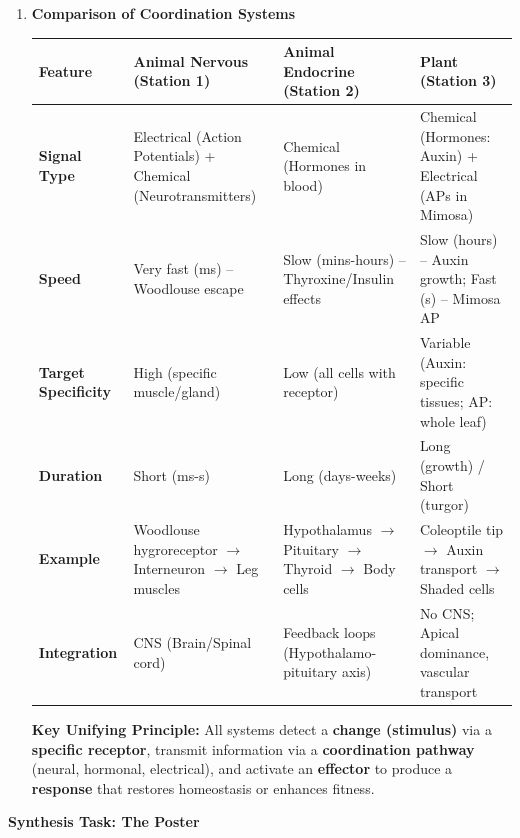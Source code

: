 \documentclass[11pt]{article}
\begin{document}
\begin{enumerate}
    \item \textbf{Comparison of Coordination Systems}
    \begin{center}
    \begin{tabularx}{\linewidth}{|l|X|X|X|}\hline
    \rowcolor{popblueL}
    \textbf{Feature} & \textbf{Animal Nervous (Station 1)} & \textbf{Animal Endocrine (Station 2)} & \textbf{Plant (Station 3)} \\\hline
    \textbf{Signal Type} & Electrical (Action Potentials) + Chemical (Neurotransmitters) & Chemical (Hormones in blood) & Chemical (Hormones: Auxin) + Electrical (APs in Mimosa) \\\hline
    \textbf{Speed} & Very fast (ms) -- Woodlouse escape & Slow (mins-hours) -- Thyroxine/Insulin effects & Slow (hours) -- Auxin growth; Fast (s) -- Mimosa AP \\\hline
    \textbf{Target Specificity} & High (specific muscle/gland) & Low (all cells with receptor) & Variable (Auxin: specific tissues; AP: whole leaf) \\\hline
    \textbf{Duration} & Short (ms-s) & Long (days-weeks) & Long (growth) / Short (turgor) \\\hline
    \textbf{Example} & Woodlouse hygroreceptor $\rightarrow$ Interneuron $\rightarrow$ Leg muscles & Hypothalamus $\rightarrow$ Pituitary $\rightarrow$ Thyroid $\rightarrow$ Body cells & Coleoptile tip $\rightarrow$ Auxin transport $\rightarrow$ Shaded cells \\\hline
    \textbf{Integration} & CNS (Brain/Spinal cord) & Feedback loops (Hypothalamo-pituitary axis) & No CNS; Apical dominance, vascular transport \\\hline
    \end{tabularx}
    \end{center}
    \textbf{Key Unifying Principle:} All systems detect a \textbf{change (stimulus)} via a \textbf{specific receptor}, transmit information via a \textbf{coordination pathway} (neural, hormonal, electrical), and activate an \textbf{effector} to produce a \textbf{response} that restores homeostasis or enhances fitness.
\end{enumerate}

\textbf{Synthesis Task: The Poster}
\end{document}

